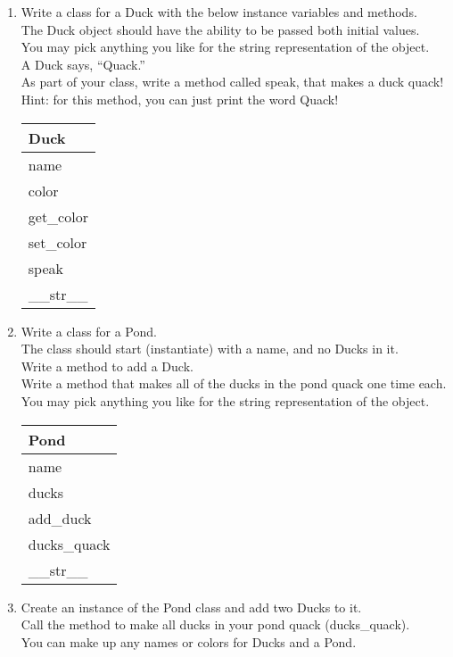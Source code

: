 
	\item
	\begin{enumerate}
		\item
			Write a class for a Duck with the below instance variables and methods. \\ 
			The Duck object should have the ability to be passed both initial values.\\  
			You may pick anything you like for the string representation of the object.\\
			A Duck says, ``Quack.''\\  
			As part of your class, write a method called speak, that makes a duck quack!\\
			Hint: for this method, you can just print the word Quack!
			\begin{flushright}
			\begin{tabular}{|l|}
				\hline
				Duck\\ \hline
				name\\	color\\	 \hline
				get\_color \\ set\_color \\ speak \\ \_\_str\_\_ \\ \hline
			\end{tabular}
			\end{flushright}

		\item
			Write a class for a Pond. \\
			The class should start (instantiate) with a name, and no Ducks in it. \\ 
			Write a method to add a Duck.\\
			Write a method that makes all of the ducks in the pond quack one time each.\\
			You may pick anything you like for the string representation of the object.
	
			\begin{flushright}
			\begin{tabular}{|l|}
				\hline
				Pond\\ \hline  	%
				name\\ ducks\\ \hline		%
				add\_duck\\ ducks\_quack \\ \_\_str\_\_ \\ \hline		%
			\end{tabular}
			\end{flushright}

		\item
			Create an instance of the Pond class and add two Ducks to it.\\
			Call the method to make all ducks in your pond quack (ducks\_quack).\\
			You can make up any names or colors for Ducks and a Pond.\\
	\end{enumerate}
